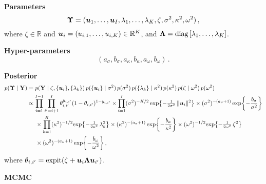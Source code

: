 \documentclass[letterpaper,12pt,openany]{article}
\def\exp#1{{\rm exp}{#1}}
\def\frac#1#2{{{#1}\over{#2}}}
\DeclareMathOperator*{\expit}{expit}
\newcommand{\diag}[1]{\text{diag}\left[#1\right]}
\newcommand{\ex}[1]{\exp{ \left\{ #1 \right\}}}
\def\Y{\mathbf{Y}}\def\y{\mathbf{y}}\def\Yv{\boldsymbol{Y}}\def\yv{\boldsymbol{y}}
\def\sig{\sigma}\def\sigv{\boldsymbol{\sigma}}
\def\ome{\omega}
\def\kap{\kappa}
\def\reals{\mathbb{R}}
\begin{document}
\textbf{Parameters} $$\UPS= (\uv_1,\ldots,\uv_I, \lambda_1,\ldots,\lambda_K, \zeta, \sigma^2, \kappa^2, \ome^2)\,,$$ where $\zeta\in\reals$ and $\uv_i=(u_{i,1},\ldots,u_{i,K})\in\reals^K$, and $\LAM = \diag{\lambda_1,\ldots, \lambda_K}$.

\textbf{Hyper-parameters} $$(a_{\sig}, b_{\sig}, a_{\kap}, b_{\kap}, a_{\ome}, b_{\ome})\,.$$

\textbf{Posterior}
\begin{align*}
p(\UPS\mid\Y) &= p(\Y\mid\zeta,\{\uv_i \}, \{\lambda_k\} )\,p(\{\uv_i \}\mid\sigma^2)\,p(\sigma^2)\,p(\{\lambda_k \}\mid\kappa^2)\,p(\kappa^2)\,p(\zeta\mid\omega^2)\,p(\omega^2)\\
&\propto\prod_{i=1}^{I-1}\prod_{i'=i+1}^I \theta_{i,i'}^{y_{i,i'}}(1-\theta_{i,i'})^{1-y_{i,i'}} \times
\prod_{i=1}^I (\sig^2)^{-K/2}\,\ex{-\tfrac{1}{2\sig^2}\,\|\uv_i\|^2} \times(\sig^2)^{-(a_\sig+1)}\,\ex{-\frac{b_\sig}{\sig^2}} \\
&\hspace{0.5cm} \times \prod_{k=1}^K (\kap^2)^{-1/2} \ex{-\tfrac{1}{2\kap^2}\,\lambda_k^2} \times(\kap^2)^{-(a_\kap+1)}\,\ex{-\frac{b_\kap}{\kap^2}} \times (\ome^2)^{-1/2} \ex{-\tfrac{1}{2\ome^2}\,\zeta^2}  \\
&\hspace{0.5cm} \times (\ome^2)^{-(a_\ome+1)}\,\ex{-\frac{b_\ome}{\ome^2}}\,,
\end{align*}
where $\theta_{i,i'}=\expit(\zeta + \uv_i \LAM \uv_{i'})$.

\textbf{MCMC} 
\end{document}
